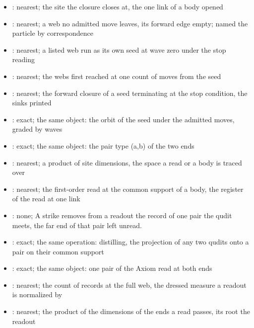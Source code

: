 \begin{chtheorem}
\begin{itemize}
\item {}: nearest; the site the closure closes at, the one link of a body opened
\item {}: nearest; a web no admitted move leaves, its forward edge empty; named the particle by correspondence
\item {}: nearest; a listed web run as its own seed at wave zero under the stop reading
\item {}: nearest; the webs first reached at one count of moves from the seed
\item {}: nearest; the forward closure of a seed terminating at the stop condition, the sinks printed
\item {}: exact; the same object: the orbit of the seed under the admitted moves, graded by waves
\item {}: exact; the same object: the pair type (a,b) of the two ends
\item {}: nearest; a product of site dimensions, the space a read or a body is traced over
\item {}: nearest; the first-order read at the common support of a body, the register of the read at one link
\item {}: none; A strike removes from a readout the record of one pair the qudit meets, the far end of that pair left unread.
\item {}: exact; the same operation: distilling, the projection of any two qudits onto a pair on their common support
\item {}: exact; the same object: one pair of the Axiom read at both ends
\item {}: nearest; the count of records at the full web, the dressed measure a readout is normalized by
\item {}: nearest; the product of the dimensions of the ends a read passes, its root the readout

\end{itemize}
\end{chtheorem}
